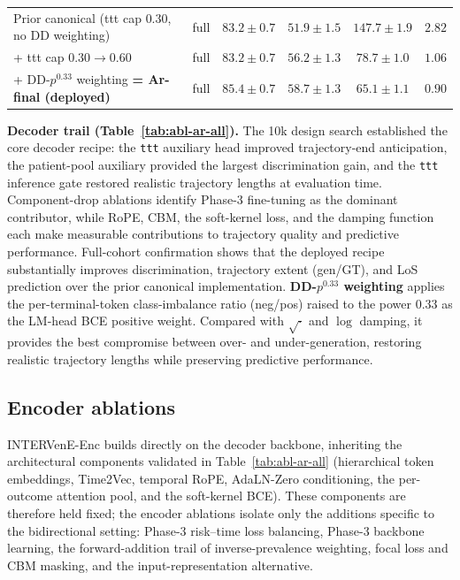 \begin{table}[!t]
\begin{tabular}{llcccc}
\midrule
Prior canonical (ttt cap $0.30$, no DD weighting)       & full & $83.2{\pm}0.7$          & $51.9{\pm}1.5$          & $147.7{\pm}1.9$         & $2.82$ \\
\quad + ttt cap $0.30{\to}0.60$            & full & $83.2{\pm}0.7$          & $56.2{\pm}1.3$          & $78.7{\pm}1.0$          & $1.06$ \\
\quad + DD-$p^{0.33}$ weighting \textbf{= Ar-final (deployed)} & full & $\mathbf{85.4{\pm}0.7}$ & $\mathbf{58.7{\pm}1.3}$ & $\mathbf{65.1{\pm}1.1}$ & $\mathbf{0.90}$ \\
\bottomrule
\end{tabular}
\end{table}

\textbf{Decoder trail (Table~\ref{tab:abl-ar-all}).}
The 10k design search established the core decoder recipe: the \texttt{ttt} auxiliary head improved trajectory-end anticipation, the patient-pool auxiliary provided the largest discrimination gain, and the \texttt{ttt} inference gate restored realistic trajectory lengths at evaluation time. Component-drop ablations identify Phase-3 fine-tuning as the dominant contributor, while RoPE, CBM, the soft-kernel loss, and the damping function each make measurable contributions to trajectory quality and predictive performance. Full-cohort confirmation shows that the deployed recipe substantially improves discrimination, trajectory extent (gen/GT), and LoS prediction over the prior canonical implementation. \textbf{DD-$p^{0.33}$ weighting} applies the per-terminal-token class-imbalance ratio (neg/pos) raised to the power $0.33$ as the LM-head BCE positive weight. Compared with $\sqrt{\cdot}$ and $\log$ damping, it provides the best compromise between over- and under-generation, restoring realistic trajectory lengths while preserving predictive performance.

\subsection{Encoder ablations}

INTERVenE-Enc builds directly on the decoder backbone, inheriting the architectural components validated in Table~\ref{tab:abl-ar-all} (hierarchical token embeddings, Time2Vec, temporal RoPE, AdaLN-Zero conditioning, the per-outcome attention pool, and the soft-kernel BCE). These components are therefore held fixed; the encoder ablations isolate only the additions specific to the bidirectional setting: Phase-3 risk--time loss balancing, Phase-3 backbone learning, the forward-addition trail of inverse-prevalence weighting, focal loss and CBM masking, and the input-representation alternative.

